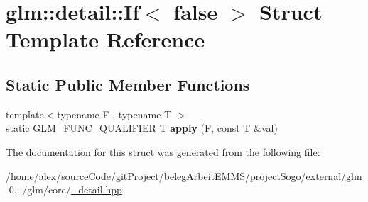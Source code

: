 \hypertarget{structglm_1_1detail_1_1If_3_01false_01_4}{\section{glm\-:\-:detail\-:\-:If$<$ false $>$ Struct Template Reference}
\label{structglm_1_1detail_1_1If_3_01false_01_4}
}
\subsection*{Static Public Member Functions}
\begin{DoxyCompactItemize}
\item 
\hypertarget{structglm_1_1detail_1_1If_3_01false_01_4_a31a9409e47dc11cb7d4251c12342b9f6}{{\footnotesize template$<$typename F , typename T $>$ }\\static G\-L\-M\-\_\-\-F\-U\-N\-C\-\_\-\-Q\-U\-A\-L\-I\-F\-I\-E\-R T {\bfseries apply} (F, const T \&val)}\label{structglm_1_1detail_1_1If_3_01false_01_4_a31a9409e47dc11cb7d4251c12342b9f6}

\end{DoxyCompactItemize}


The documentation for this struct was generated from the following file\-:\begin{DoxyCompactItemize}
\item 
/home/alex/source\-Code/git\-Project/beleg\-Arbeit\-E\-M\-M\-S/project\-Sogo/external/glm-\/0.../glm/core/\hyperlink{__detail_8hpp}{\-\_\-detail.\-hpp}\end{DoxyCompactItemize}
